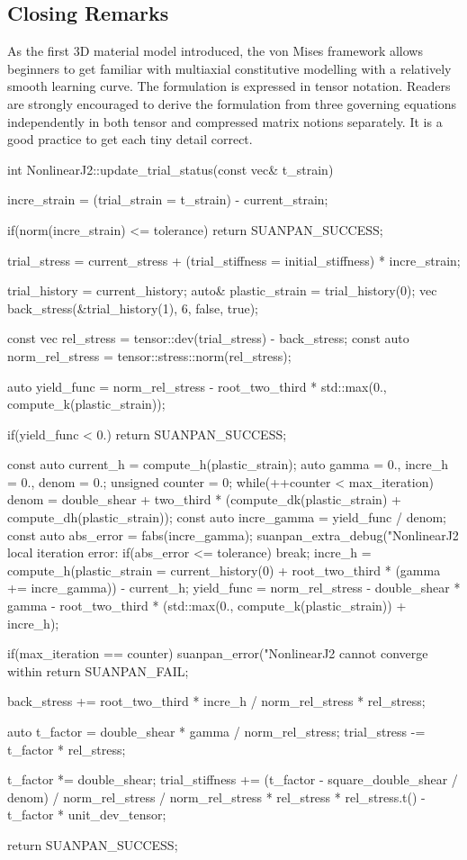 \subsection{Closing Remarks}
As the first 3D material model introduced, the von Mises framework allows beginners to get familiar with multiaxial constitutive modelling with a relatively smooth learning curve. The formulation is expressed in tensor notation. Readers are strongly encouraged to derive the formulation from three governing equations independently in both tensor and compressed matrix notions separately. It is a good practice to get each tiny detail correct.
\begin{cppcode}
int NonlinearJ2::update_trial_status(const vec& t_strain) {
    incre_strain = (trial_strain = t_strain) - current_strain;

    if(norm(incre_strain) <= tolerance) return SUANPAN_SUCCESS;

    trial_stress = current_stress + (trial_stiffness = initial_stiffness) * incre_strain;

    trial_history = current_history;
    auto& plastic_strain = trial_history(0);
    vec back_stress(&trial_history(1), 6, false, true);

    const vec rel_stress = tensor::dev(trial_stress) - back_stress;
    const auto norm_rel_stress = tensor::stress::norm(rel_stress);

    auto yield_func = norm_rel_stress - root_two_third * std::max(0., compute_k(plastic_strain));

    if(yield_func < 0.) return SUANPAN_SUCCESS;

    const auto current_h = compute_h(plastic_strain);
    auto gamma = 0., incre_h = 0., denom = 0.;
    unsigned counter = 0;
    while(++counter < max_iteration) {
        denom = double_shear + two_third * (compute_dk(plastic_strain) + compute_dh(plastic_strain));
        const auto incre_gamma = yield_func / denom;
        const auto abs_error = fabs(incre_gamma);
        suanpan_extra_debug("NonlinearJ2 local iteration error: %
        if(abs_error <= tolerance) break;
        incre_h = compute_h(plastic_strain = current_history(0) + root_two_third * (gamma += incre_gamma)) - current_h;
        yield_func = norm_rel_stress - double_shear * gamma - root_two_third * (std::max(0., compute_k(plastic_strain)) + incre_h);
    }

    if(max_iteration == counter) {
        suanpan_error("NonlinearJ2 cannot converge within %
        return SUANPAN_FAIL;
    }

    back_stress += root_two_third * incre_h / norm_rel_stress * rel_stress;

    auto t_factor = double_shear * gamma / norm_rel_stress;
    trial_stress -= t_factor * rel_stress;

    t_factor *= double_shear;
    trial_stiffness += (t_factor - square_double_shear / denom) / norm_rel_stress / norm_rel_stress * rel_stress * rel_stress.t() - t_factor * unit_dev_tensor;

    return SUANPAN_SUCCESS;
}
\end{cppcode}
